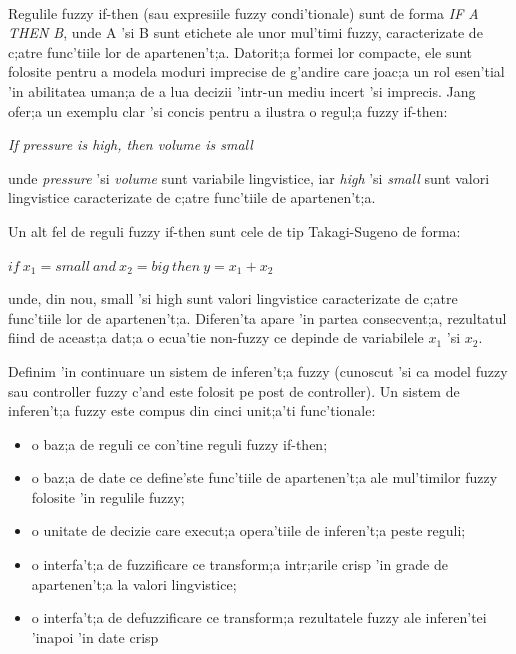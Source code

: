 \paragraph{}
Regulile fuzzy if-then (sau expresiile fuzzy condi'tionale) sunt de forma \textit{IF A THEN B}, unde A 'si B sunt etichete ale unor mul'timi fuzzy, caracterizate de c;atre func'tiile lor de apartenen't;a. Datorit;a formei lor compacte, ele sunt folosite pentru a modela moduri imprecise de g'andire care joac;a un rol esen'tial 'in abilitatea uman;a de a lua decizii 'intr-un mediu incert 'si imprecis.
Jang ofer;a un exemplu clar 'si concis pentru a ilustra o regul;a fuzzy if-then: \\
\begin{center}\textit{If pressure is high, then volume is small} \cite{anfis} \end{center}
unde \textit{pressure} 'si \textit{volume} sunt variabile lingvistice, iar \textit{high} 'si \textit{small} sunt valori lingvistice caracterizate de c;atre func'tiile de apartenen't;a.
\par
Un alt fel de reguli fuzzy if-then sunt cele de tip Takagi-Sugeno \cite{takagisugeno} de forma: \\
\begin{center}$if\ x_{1} = small\ and\ x_{2} = big\ then\ y = x_{1} + x_{2}$ \end{center}
unde, din nou, small 'si high sunt valori lingvistice caracterizate de c;atre func'tiile lor de apartenen't;a. Diferen'ta apare 'in partea consecvent;a, rezultatul fiind de aceast;a dat;a o ecua'tie non-fuzzy ce depinde de variabilele $x_{1}$ 'si $x_{2}$. 
\par
Definim 'in continuare un sistem de inferen't;a fuzzy (cunoscut 'si ca model fuzzy sau controller fuzzy c'and este folosit pe post de controller). Un sistem de inferen't;a fuzzy este compus din cinci unit;a'ti func'tionale:
\begin{itemize}
\item o baz;a de reguli ce con'tine reguli fuzzy if-then;
\item o baz;a de date ce define'ste func'tiile de apartenen't;a ale mul'timilor fuzzy folosite 'in regulile fuzzy;
\item o unitate de decizie care execut;a opera'tiile de inferen't;a peste reguli;
\item o interfa't;a de fuzzificare ce transform;a intr;arile crisp 'in grade de apartenen't;a la valori lingvistice;
\item o interfa't;a de defuzzificare ce transform;a rezultatele fuzzy ale inferen'tei 'inapoi 'in date crisp
\end{itemize}
